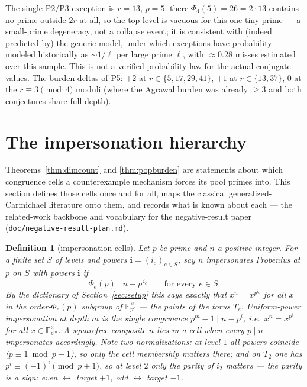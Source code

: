 \documentclass[11pt]{article}
\newtheorem{definition}[theorem]{Definition}
\theoremstyle{remark}
\newcommand{\F}{\mathbb{F}}
\begin{document}
The single P2/P3 exception is $r = 13$, $p = 5$: there $\Phi_4(5) = 26 =
2 \cdot 13$ contains no prime outside $2r$ at all, so the top level is
vacuous for this one tiny prime --- a small-prime degeneracy, not a
collapse event; it is consistent with (indeed predicted by) the generic
model, under which exceptions have probability modeled historically as $\sim1/\ell$ per large prime $\ell$,
with $\approx0.28$ misses estimated over this sample. This is not a verified
probability law for the actual conjugate values. The
burden deltas of P5: $+2$ at $r \in \{5, 17, 29, 41\}$, $+1$ at
$r \in \{13, 37\}$, $0$ at the $r \equiv 3 \pmod 4$ moduli (where the
Agrawal burden was already $\ge 3$ and both conjectures share full depth).

\section{The impersonation hierarchy}\label{sec:hierarchy}

Theorems~\ref{thm:dimcount} and \ref{thm:popburden} are statements about
which congruence cells a counterexample mechanism forces its pool primes
into. This section defines those cells once and for all, maps the classical
generalized-Carmichael literature onto them, and records what is known about
each --- the related-work backbone and vocabulary for the negative-result
paper (\texttt{doc/negative-result-plan.md}).

\begin{definition}[impersonation cells]\label{def:cells}
Let $p$ be prime and $n$ a positive integer. For a finite set $S$ of levels and
powers $\mathbf i = (i_e)_{e \in S}$, say \emph{$n$ impersonates Frobenius
at $p$ on $S$ with powers $\mathbf i$} if
\[
\Phi_e(p) \mid n - p^{\,i_e} \qquad \text{for every } e \in S .
\]
By the dictionary of Section~\ref{sec:setup} this says exactly that
$x^n = x^{p^{i_e}}$ for all $x$ in the order-$\Phi_e(p)$ subgroup of
$\F_{p^e}^\times$ --- the points of the torus $T_e$. Uniform-power
impersonation at \emph{depth} $m$ is the single congruence
$p^m - 1 \mid n - p^i$, i.e.\ $x^n = x^{p^i}$ for all
$x \in \F_{p^m}^\times$. A squarefree composite $n$ \emph{lies in a cell}
when every $p \mid n$ impersonates accordingly. Note two normalizations:
at level $1$ all powers coincide ($p \equiv 1 \bmod p-1$), so only the cell
membership matters there; and on $T_2$ one has $p^i \equiv (-1)^i
\pmod{p+1}$, so at level $2$ only the \emph{parity} of $i_2$ matters ---
the parity is a sign: even $\leftrightarrow$ target $+1$, odd
$\leftrightarrow$ target $-1$.
\end{definition}
\end{document}
